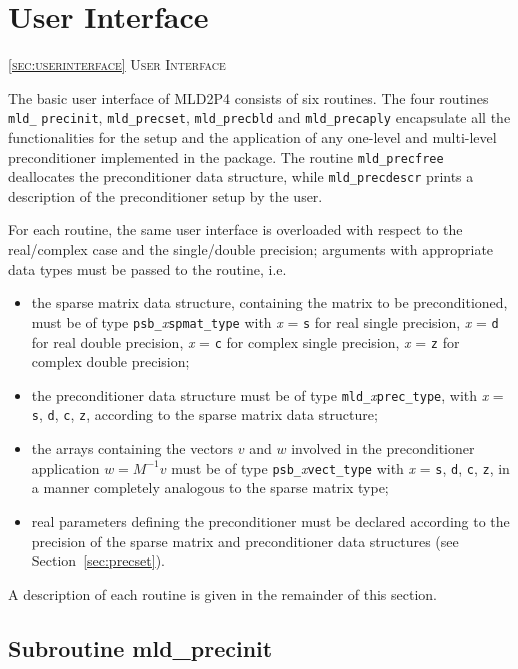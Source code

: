 \section{User Interface\label{sec:userinterface}}
         {\textsc{\ref{sec:userinterface} User Interface}}


The basic user interface of MLD2P4 consists of six routines. The four routines \verb|mld_| \verb|precinit|,
\verb|mld_precset|, \verb|mld_precbld| and \verb|mld_precaply| encapsulate all the functionalities
for the setup and the application of any one-level and multi-level
preconditioner implemented in the package.
The routine \verb|mld_precfree| deallocates the preconditioner data structure, while
\verb|mld_precdescr| prints a description of the preconditioner setup by the user.

For each routine, the same user interface is overloaded with
respect to the real/complex case and the single/double precision;
arguments with appropriate data types must be passed to the routine,
i.e.
\begin{itemize}
\item the sparse matrix data structure, containing the matrix to be
  preconditioned, must be of type \verb|psb_|\emph{x}\verb|spmat_type|
	with \emph{x} = \verb|s| for real single precision, \emph{x} = \verb|d|
	for real double precision, \emph{x} = \verb|c| for complex single precision,
	\emph{x} = \verb|z| for complex double precision;
\item the preconditioner data structure must be of type
  \verb|mld_|\emph{x}\verb|prec_type|, with \emph{x} =    
  \verb|s|, \verb|d|, \verb|c|, \verb|z|, according to the sparse
  matrix data structure;
\item the arrays containing the vectors $v$ and $w$ involved in
  the preconditioner application $w=M^{-1}v$ must be of type   
  \verb|psb_|\emph{x}\verb|vect_type| with \emph{x} =    
  \verb|s|, \verb|d|, \verb|c|, \verb|z|, in a manner completely
  analogous to the sparse matrix type;
\item real parameters defining the preconditioner must be declared
  according to the precision of the sparse matrix and preconditioner
  data structures (see Section~\ref{sec:precset}).
\end{itemize}
A description of each routine is given in the remainder of this section.

\clearpage

\subsection{Subroutine mld\_precinit\label{sec:precinit}}

